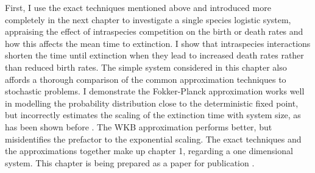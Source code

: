First, I use the exact techniques mentioned above and introduced more completely in the next chapter to investigate a single species logistic system, appraising the effect of intraspecies competition on the birth or death rates and how this affects the mean time to extinction. 
I show that intraspecies interactions shorten the time until extinction when they lead to increased death rates rather than reduced birth rates. 
The simple system considered in this chapter also affords a thorough comparison of the common approximation techniques to stochastic problems. %
I demonstrate the Fokker-Planck approximation works well in modelling the probability distribution close to the deterministic fixed point, but incorrectly estimates the scaling of the extinction time with system size, as has been shown before \cite{Grasman1983,Doering2005}. 
The WKB approximation performs better, but misidentifies the prefactor to the exponential scaling. %
The exact techniques and the approximations together make up chapter 1, regarding a one dimensional system. %
This chapter is being prepared as a paper for publication \cite{Badali2019b}. 

